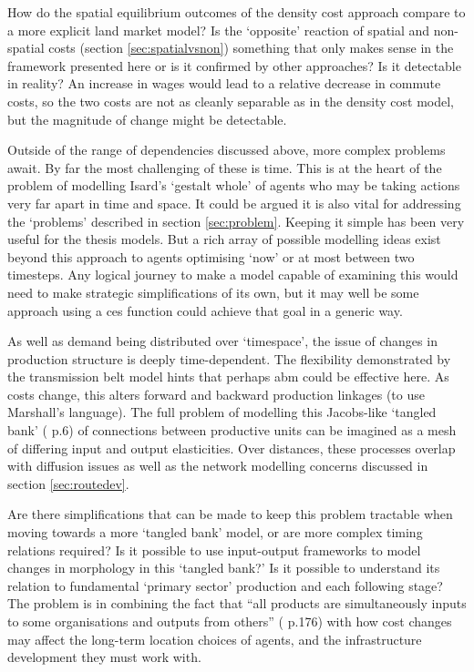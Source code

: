 How do the spatial equilibrium outcomes of the density cost approach compare to a more explicit land market model? Is the `opposite' reaction of spatial and non-spatial costs (section \ref{sec:spatialvsnon}) something that only makes sense in the framework presented here or is it confirmed by other approaches? Is it detectable in reality? An increase in wages would lead to a relative decrease in commute costs, so the two costs are not as cleanly separable as in the density cost model, but the magnitude of change might be detectable.

Outside of the range of dependencies discussed above, more complex problems await. By far the most challenging of these is time. This is at the heart of the problem of modelling Isard's `gestalt whole' of agents who may be taking actions very far apart in time and space. It could be argued it is also vital for addressing the `problems' described in section \ref{sec:problem}. Keeping it simple has been very useful for the thesis models. But a rich array of possible modelling ideas exist beyond this approach to agents optimising `now' or at most between two timesteps. Any logical journey to make a model capable of examining this would need to make strategic simplifications of its own, but it may well be some approach using a \gls{ces} function could achieve that goal in a generic way. 

As well as demand being distributed over `timespace', the issue of changes in production structure is deeply time-dependent. The flexibility demonstrated by the transmission belt model hints that perhaps \gls{abm} could be effective here. As costs change, this alters forward and backward production linkages (to use Marshall's language). The full problem of modelling this Jacobs-like `tangled bank' (\citealt{ellerman_jane_2002} p.6) of connections between productive units can be imagined as a mesh of differing input and output elasticities. Over distances, these processes overlap with diffusion issues as well as the network modelling concerns discussed in section \ref{sec:routedev}. 

Are there simplifications that can be made to keep this problem tractable when moving towards a more `tangled bank' model, or are more complex timing relations required? Is it possible to use input-output frameworks to model changes in morphology in this `tangled bank?' Is it possible to understand its relation to fundamental `primary sector' production and each following stage? The problem is in combining the fact that ``all products are simultaneously inputs to some organisations and outputs from others'' (\citealt{birkin_industrial_1986} p.176)  with how cost changes may affect the long-term location choices of agents, and the infrastructure development they must work with. 

